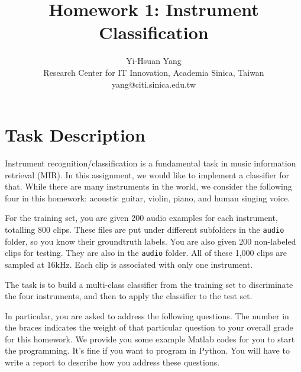 \documentclass[twoside,a4paper]{refart}
\title{Homework 1: Instrument Classification}
\author{
Yi-Hsuan Yang\\
Research Center for IT Innovation, Academia Sinica, Taiwan\\
yang@citi.sinica.edu.tw\\
}
\date{}
\begin{document}
\maketitle

\large

\section{Task Description}

Instrument recognition/classification is a fundamental task in music information retrieval (MIR). In this assignment, we would like to implement a classifier for that. While there are many instruments in the world, we consider the following four in this homework: acoustic guitar, violin, piano, and human singing voice.

For the training set, you are given 200 audio examples for each instrument, totalling 800 clips. These files are put under different subfolders in the \texttt{audio} folder, so you know their groundtruth labels. You are also given 200 non-labeled clips for testing. They are also in the \texttt{audio} folder. All of these 1,000 clips are sampled at 16kHz. Each clip is associated with only one instrument.

The task is to build a multi-class classifier from the training set to discriminate the four instruments, and then to apply the classifier to the test set.

In particular, you are asked to address the following questions. The number in the braces indicates the weight of that particular question to your overall grade for this homework. We provide you some example Matlab codes for you to start the programming. It's fine if you want to program in Python. You will have to write a report to describe how you address these questions.
\end{document}

